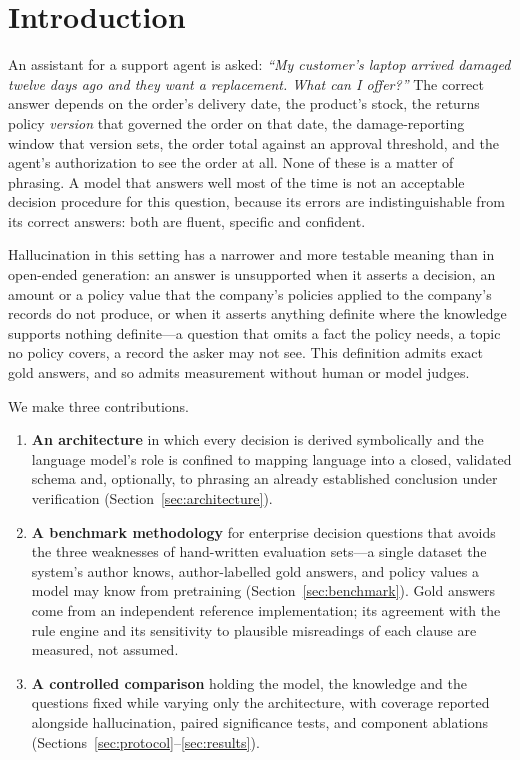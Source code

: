 \documentclass[11pt]{article}
\begin{document}
\section{Introduction}

An assistant for a support agent is asked: \emph{``My customer's laptop arrived damaged
twelve days ago and they want a replacement. What can I offer?''} The correct answer
depends on the order's delivery date, the product's stock, the returns policy
\emph{version} that governed the order on that date, the damage-reporting window that
version sets, the order total against an approval threshold, and the agent's
authorization to see the order at all. None of these is a matter of phrasing. A model that
answers well most of the time is not an acceptable decision procedure for this question,
because its errors are indistinguishable from its correct answers: both are fluent,
specific and confident.

Hallucination in this setting has a narrower and more testable meaning than in open-ended
generation: an answer is unsupported when it asserts a decision, an amount or a policy
value that the company's policies applied to the company's records do not produce, or when
it asserts anything definite where the knowledge supports nothing definite---a question
that omits a fact the policy needs, a topic no policy covers, a record the asker may not
see. This definition admits exact gold answers, and so admits measurement without human or
model judges.

We make three contributions.
\begin{enumerate}[leftmargin=*]
\item \textbf{An architecture} in which every decision is derived symbolically and the
language model's role is confined to mapping language into a closed, validated schema
and, optionally, to phrasing an already established conclusion under verification
(Section~\ref{sec:architecture}).
\item \textbf{A benchmark methodology} for enterprise decision questions that avoids the
three weaknesses of hand-written evaluation sets---a single dataset the system's author
knows, author-labelled gold answers, and policy values a model may know from pretraining
(Section~\ref{sec:benchmark}). Gold answers come from an independent reference
implementation; its agreement with the rule engine and its sensitivity to plausible
misreadings of each clause are measured, not assumed.
\item \textbf{A controlled comparison} holding the model, the knowledge and the questions
fixed while varying only the architecture, with coverage reported alongside
hallucination, paired significance tests, and component ablations
(Sections~\ref{sec:protocol}--\ref{sec:results}).
\end{enumerate}
\end{document}
